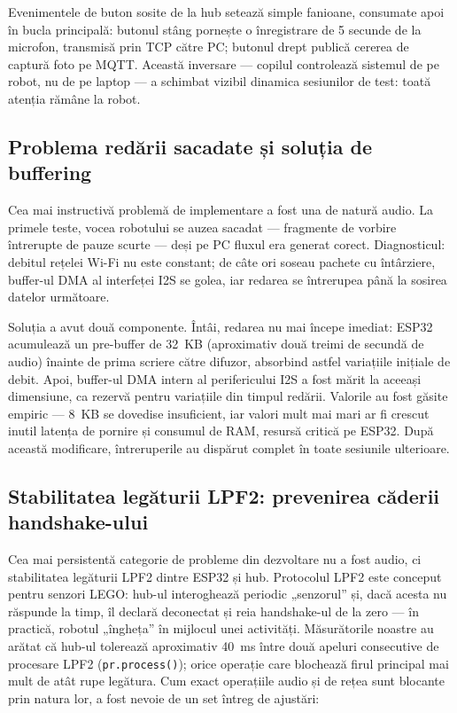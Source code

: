 Evenimentele de buton sosite de la hub setează simple fanioane, consumate apoi în bucla principală: butonul stâng pornește o înregistrare de 5 secunde de la microfon, transmisă prin TCP către PC; butonul drept publică cererea de captură foto pe MQTT. Această inversare — copilul controlează sistemul de pe robot, nu de pe laptop — a schimbat vizibil dinamica sesiunilor de test: toată atenția rămâne la robot.

\subsection{Problema redării sacadate și soluția de buffering}

Cea mai instructivă problemă de implementare a fost una de natură audio. La primele teste, vocea robotului se auzea sacadat — fragmente de vorbire întrerupte de pauze scurte — deși pe PC fluxul era generat corect. Diagnosticul: debitul rețelei Wi-Fi nu este constant; de câte ori soseau pachete cu întârziere, buffer-ul DMA al interfeței I2S se golea, iar redarea se întrerupea până la sosirea datelor următoare.

Soluția a avut două componente. Întâi, redarea nu mai începe imediat: ESP32 acumulează un pre-buffer de 32~KB (aproximativ două treimi de secundă de audio) înainte de prima scriere către difuzor, absorbind astfel variațiile inițiale de debit. Apoi, buffer-ul DMA intern al perifericului I2S a fost mărit la aceeași dimensiune, ca rezervă pentru variațiile din timpul redării. Valorile au fost găsite empiric — 8~KB se dovedise insuficient, iar valori mult mai mari ar fi crescut inutil latența de pornire și consumul de RAM, resursă critică pe ESP32. După această modificare, întreruperile au dispărut complet în toate sesiunile ulterioare.

\subsection{Stabilitatea legăturii LPF2: prevenirea căderii handshake-ului}
\label{sec:lpf2-stabilitate}

Cea mai persistentă categorie de probleme din dezvoltare nu a fost audio, ci stabilitatea legăturii LPF2 dintre ESP32 și hub. Protocolul LPF2 este conceput pentru senzori LEGO: hub-ul interoghează periodic „senzorul” și, dacă acesta nu răspunde la timp, îl declară deconectat și reia handshake-ul de la zero — în practică, robotul „îngheța” în mijlocul unei activități. Măsurătorile noastre au arătat că hub-ul tolerează aproximativ 40~ms între două apeluri consecutive de procesare LPF2 (\texttt{pr.process()}); orice operație care blochează firul principal mai mult de atât rupe legătura. Cum exact operațiile audio și de rețea sunt blocante prin natura lor, a fost nevoie de un set întreg de ajustări:

